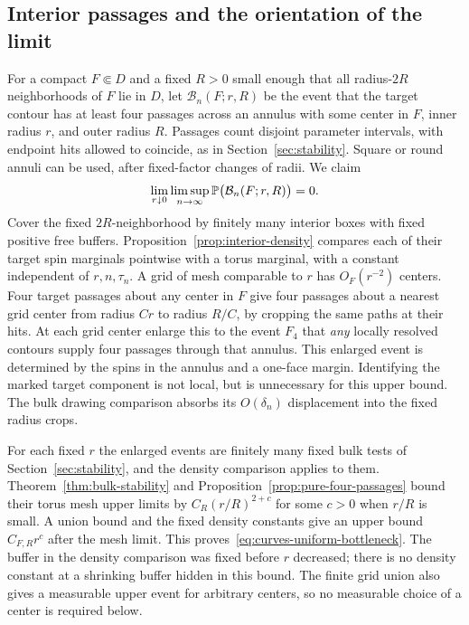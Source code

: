 \subsection{Interior passages and the orientation of the limit}

For a compact $F\Subset D$ and a fixed $R>0$ small enough that all
radius-$2R$ neighborhoods of $F$ lie in $D$, let $\mathcal B_n(F;r,R)$
be the event that the target contour has at least four passages across
an annulus with some center in $F$, inner radius $r$, and outer radius
$R$.  Passages count disjoint parameter intervals, with endpoint hits
allowed to coincide, as in Section~\ref{sec:stability}.  Square or round
annuli can be used, after fixed-factor changes of radii.  We claim
\begin{equation}
 \lim_{r\downarrow0}\limsup_{n\to\infty}
 \P\bigl(\mathcal B_n(F;r,R)\bigr)=0.
 \label{eq:curves-uniform-bottleneck}
\end{equation}
Cover the fixed $2R$-neighborhood by finitely many interior boxes with
fixed positive free buffers.  Proposition~\ref{prop:interior-density}
compares each of their target spin marginals pointwise with a torus
marginal, with a constant independent of $r,n,\tau_n$.  A grid of mesh
comparable to $r$ has $O_F(r^{-2})$ centers.  Four target passages about
any center in $F$ give four passages about a nearest grid center from
radius $Cr$ to radius $R/C$, by cropping the same paths at their hits.
At each grid center enlarge this to the event $F_4$ that \emph{any}
locally resolved contours supply four passages through that annulus.
This enlarged event is determined by the spins in the annulus and a
one-face margin.  Identifying the marked target component is not local,
but is unnecessary for this upper bound.  The bulk drawing comparison
absorbs its $O(\delta_n)$ displacement into the fixed radius crops.

For each fixed $r$ the enlarged events are finitely many fixed bulk
tests of Section~\ref{sec:stability}, and the density comparison applies
to them.  Theorem~\ref{thm:bulk-stability} and
Proposition~\ref{prop:pure-four-passages} bound their torus mesh upper
limits by $C_R(r/R)^{2+c}$ for some $c>0$ when $r/R$ is small.  A union
bound and the fixed density constants give an upper bound $C_{F,R}r^c$
after the mesh limit.  This proves~\eqref{eq:curves-uniform-bottleneck}.
The buffer in the density comparison was fixed before $r$ decreased;
there is no density constant at a shrinking buffer hidden in this bound.
The finite grid union also gives a measurable upper event for arbitrary
centers, so no measurable choice of a center is required below.

